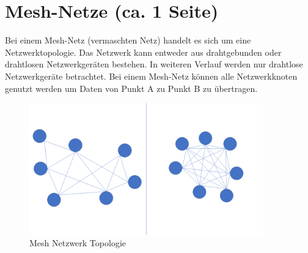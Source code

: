 \section{Mesh-Netze (ca. 1 Seite)}

Bei einem Mesh-Netz (vermaschten Netz) handelt es sich um eine Netzwerktopologie. Das Netzwerk kann entweder aus drahtgebunden oder drahtlosen Netzwerkgeräten bestehen. In weiteren Verlauf werden nur drahtlose Netzwerkgeräte betrachtet. Bei einem Mesh-Netz können alle Netzwerkknoten genutzt werden um Daten von Punkt A zu Punkt B zu übertragen. 
\begin{figure}
	\centering
	\includegraphics[width=0.9\textwidth]{bilder/vermaschtesNetz.png}
	\caption{Mesh Netzwerk Topologie}
	\label{img:vermaschtesNetz}
\end{figure}

